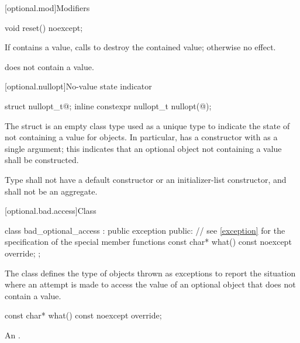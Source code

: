[optional.mod]{Modifiers}

%
\begin{itemdecl}
void reset() noexcept;
\end{itemdecl}

\begin{itemdescr}
\pnum
\effects
If  contains a value, calls  to destroy the contained value;
otherwise no effect.

\pnum
\ensures
{} does not contain a value.
\end{itemdescr}

[optional.nullopt]{No-value state indicator}

%
%
\begin{itemdecl}
struct nullopt_t{@\seebelow@};
inline constexpr nullopt_t nullopt(@\unspec@);
\end{itemdecl}

\pnum
The struct  is an empty class type used as a unique type to indicate the state of not containing a value for  objects.
In particular,  has a constructor with  as a single argument;
this indicates that an optional object not containing a value shall be constructed.

\pnum
Type  shall not have a default constructor or an initializer-list constructor, and shall not be an aggregate.

[optional.bad.access]{Class }

\begin{codeblock}
class bad_optional_access : public exception {
public:
  // see \ref{exception} for the specification of the special member functions
  const char* what() const noexcept override;
};
\end{codeblock}

\pnum
The class  defines the type of objects thrown as exceptions to report the situation where an attempt is made to access the value of an optional object that does not contain a value.

%
\begin{itemdecl}
const char* what() const noexcept override;
\end{itemdecl}

\begin{itemdescr}
\pnum
\returns
An  \ntbs{}.
\end{itemdescr}


